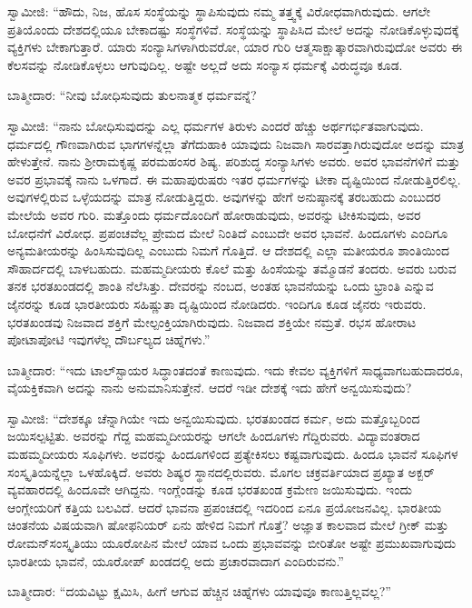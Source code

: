 ಸ್ವಾಮೀಜಿ: “ಹೌದು, ನಿಜ, ಹೊಸ ಸಂಸ್ಥೆಯನ್ನು ಸ್ಥಾಪಿಸುವುದು ನಮ್ಮ ತತ್ತ್ವಕ್ಕೆ ವಿರೋಧವಾಗಿರುವುದು. ಆಗಲೇ ಪ್ರತಿಯೊಂದು ದೇಶದಲ್ಲಿಯೂ ಬೇಕಾದಷ್ಟು ಸಂಸ್ಥೆಗಳಿವೆ. ಸಂಸ್ಥೆಯನ್ನು ಸ್ಥಾಪಿಸಿದ ಮೇಲೆ ಅದನ್ನು ನೋಡಿಕೊಳ್ಳುವುದಕ್ಕೆ ವ್ಯಕ್ತಿಗಳು ಬೇಕಾಗುತ್ತಾರೆ. ಯಾರು ಸಂನ್ಯಾಸಿಗಳಾಗಿರುವರೋ, ಯಾರ ಗುರಿ ಆತ್ಮಸಾಕ್ಷಾತ್ಕಾರವಾಗಿರುವುದೋ ಅವರು ಈ ಕೆಲಸವನ್ನು ನೋಡಿಕೊಳ್ಳಲು ಆಗುವುದಿಲ್ಲ. ಅಷ್ಟೇ ಅಲ್ಲದೆ ಅದು ಸಂನ್ಯಾಸ ಧರ್ಮಕ್ಕೆ ವಿರುದ್ಧವೂ ಕೂಡ.

ಬಾತ್ಮೀದಾರ: “ನೀವು ಬೋಧಿಸುವುದು ತುಲನಾತ್ಮಕ ಧರ್ಮವನ್ನೆ?

ಸ್ವಾಮೀಜಿ: “ನಾನು ಬೋಧಿಸುವುದನ್ನು ಎಲ್ಲ ಧರ್ಮಗಳ ತಿರುಳು ಎಂದರೆ ಹೆಚ್ಚು ಅರ್ಥಗರ್ಭಿತವಾಗುವುದು. ಧರ್ಮದಲ್ಲಿ ಗೌಣವಾಗಿರುವ ಭಾಗಗಳನ್ನೆಲ್ಲಾ ತೆಗೆದುಹಾಕಿ ಯಾವುದು ನಿಜವಾಗಿ ಸಾರವತ್ತಾಗಿರುವುದೋ ಅದನ್ನು ಮಾತ್ರ ಹೇಳುತ್ತೇನೆ. ನಾನು ಶ‍್ರೀರಾಮಕೃಷ್ಣ ಪರಮಹಂಸರ ಶಿಷ್ಯ. ಪರಿಶುದ್ಧ ಸಂನ್ಯಾಸಿಗಳು ಅವರು. ಅವರ ಭಾವನೆಗಳಿಗೆ ಮತ್ತು ಅವರ ಪ್ರಭಾವಕ್ಕೆ ನಾನು ಒಳಗಾದೆ. ಈ ಮಹಾಪುರುಷರು ಇತರ ಧರ್ಮಗಳನ್ನು ಟೀಕಾ ದೃಷ್ಟಿಯಿಂದ ನೋಡುತ್ತಿರಲಿಲ್ಲ. ಅವುಗಳಲ್ಲಿರುವ ಒಳ್ಳೆಯದನ್ನು ಮಾತ್ರ ನೋಡುತ್ತಿದ್ದರು. ಅವುಗಳನ್ನು ಹೇಗೆ ಅನುಷ್ಠಾನಕ್ಕೆ ತರಬಹುದು ಎಂಬುದರ ಮೇಲೆಯೆ ಅವರ ಗುರಿ. ಮತ್ತೊಂದು ಧರ್ಮದೊಂದಿಗೆ ಹೋರಾಡುವುದು, ಅವರನ್ನು ಟೀಕಿಸುವುದು, ಅವರ ಬೋಧನೆಗೆ ವಿರೋಧ. ಪ್ರಪಂಚವೆಲ್ಲ ಪ್ರೇಮದ ಮೇಲೆ ನಿಂತಿದೆ ಎಂಬುದೇ ಅವರ ಭಾವನೆ. ಹಿಂದೂಗಳು ಎಂದಿಗೂ ಅನ್ಯಮತೀಯರನ್ನು ಹಿಂಸಿಸುವುದಿಲ್ಲ ಎಂಬುದು ನಿಮಗೆ ಗೊತ್ತಿದೆ. ಆ ದೇಶದಲ್ಲಿ ಎಲ್ಲಾ ಮತೀಯರೂ ಶಾಂತಿಯಿಂದ ಸೌಹಾರ್ದದಲ್ಲಿ ಬಾಳಬಹುದು. ಮಹಮ್ಮದೀಯರು ಕೊಲೆ ಮತ್ತು ಹಿಂಸೆಯನ್ನು ತಮ್ಮೊಡನೆ ತಂದರು. ಅವರು ಬರುವ ತನಕ ಭರತಖಂಡದಲ್ಲಿ ಶಾಂತಿ ನೆಲೆಸಿತ್ತು. ದೇವರನ್ನು ನಂಬದ, ಅಂತಹ ಭಾವನೆಯನ್ನು ಒಂದು ಭ್ರಾಂತಿ ಎನ್ನುವ ಜೈನರನ್ನು ಕೂಡ ಭಾರತೀಯರು ಸಹಿಷ್ಣುತಾ ದೃಷ್ಟಿಯಿಂದ ನೋಡಿದರು. ಇಂದಿಗೂ ಕೂಡ ಜೈನರು ಇರುವರು. ಭರತಖಂಡವು ನಿಜವಾದ ಶಕ್ತಿಗೆ ಮೇಲ್ಪಂಕ್ತಿಯಾಗಿರುವುದು. ನಿಜವಾದ ಶಕ್ತಿಯೇ ನಮ್ರತೆ. ರಭಸ ಹೋರಾಟ ಪೋಟಾಪೋಟಿ ಇವುಗಳೆಲ್ಲ ದೌರ್ಬಲ್ಯದ ಚಿಹ್ನೆಗಳು.”

ಬಾತ್ಮೀದಾರ: “ಇದು ಟಾಲ್​ಸ್ಟಾಯರ ಸಿದ್ಧಾಂತದಂತೆ ಕಾಣುವುದು. ಇದು ಕೇವಲ ವ್ಯಕ್ತಿಗಳಿಗೆ ಸಾಧ್ಯವಾಗಬಹುದಾದರೂ, ವೈಯಕ್ತಿಕವಾಗಿ ಅದನ್ನು ನಾನು ಅನುಮಾನಿಸುತ್ತೇನೆ. ಆದರೆ ಇಡೀ ದೇಶಕ್ಕೆ ಇದು ಹೇಗೆ ಅನ್ವಯಿಸುವುದು?

ಸ್ವಾಮೀಜಿ: “ದೇಶಕ್ಕೂ ಚೆನ್ನಾಗಿಯೇ ಇದು ಅನ್ವಯಿಸುವುದು. ಭರತಖಂಡದ ಕರ್ಮ, ಅದು ಮತ್ತೊಬ್ಬರಿಂದ ಜಯಿಸಲ್ಪಟ್ಟಿತು. ಅವರನ್ನು ಗೆದ್ದ ಮಹಮ್ಮದೀಯರನ್ನು ಆಗಲೇ ಹಿಂದೂಗಳು ಗೆದ್ದಿರುವರು. ವಿದ್ಯಾವಂತರಾದ ಮಹಮ್ಮದೀಯರು ಸೂಫಿಗಳು. ಅವರನ್ನು ಹಿಂದೂಗಳಿಂದ ಪ್ರತ್ಯೇಕಿಸಲು ಕಷ್ಟವಾಗುವುದು. ಹಿಂದೂ ಭಾವನೆ ಸೂಫಿಗಳ ಸಂಸ್ಕೃತಿಯನ್ನೆಲ್ಲಾ ಒಳಹೊಕ್ಕಿದೆ. ಅವರು ಶಿಷ್ಯರ ಸ್ಥಾನದಲ್ಲಿರುವರು. ಮೊಗಲ ಚಕ್ರವರ್ತಿಯಾದ ಪ್ರಖ್ಯಾತ ಅಕ್ಬರ್​ ವ್ಯವಹಾರದಲ್ಲಿ ಹಿಂದೂವೇ ಆಗಿದ್ದನು. ಇಂಗ್ಲೆಂಡನ್ನು ಕೂಡ ಭರತಖಂಡ ಕ್ರಮೇಣ ಜಯಿಸುವುದು. ಇಂದು ಆಂಗ್ಲೇಯರಿಗೆ ಕತ್ತಿಯ ಬಲವಿದೆ. ಆದರೆ ಭಾವನಾ ಪ್ರಪಂಚದಲ್ಲಿ ಇದರಿಂದ ಏನೂ ಪ್ರಯೋಜನವಿಲ್ಲ. ಭಾರತೀಯ ಚಿಂತನೆಯ ವಿಷಯವಾಗಿ ಷೋಫನಿಯರ್​ ಏನು ಹೇಳಿದ ನಿಮಗೆ ಗೊತ್ತೆ? ಅಜ್ಞಾತ ಕಾಲವಾದ ಮೇಲೆ ಗ್ರೀಕ್​ ಮತ್ತು ರೋಮನ್​ ಸಂಸ್ಕೃತಿಯು ಯೂರೋಪಿನ ಮೇಲೆ ಯಾವ ಒಂದು ಪ್ರಭಾವವನ್ನು ಬೀರಿತೋ ಅಷ್ಟೇ ಪ್ರಮುಖವಾಗುವುದು ಭಾರತೀಯ ಭಾವನೆ, ಯೂರೋಪ್​ ಖಂಡದಲ್ಲಿ ಅದು ಪ್ರಚಾರವಾದಾಗ ಎಂದಿರುವನು.”

ಬಾತ್ಮೀದಾರ: “ದಯವಿಟ್ಟು ಕ್ಷಮಿಸಿ, ಹೀಗೆ ಆಗುವ ಹೆಚ್ಚಿನ ಚಿಹ್ನೆಗಳು ಯಾವುವೂ ಕಾಣುತ್ತಿಲ್ಲವಲ್ಲ?”


